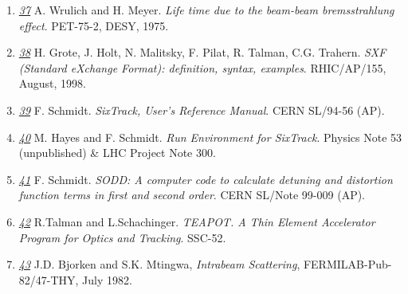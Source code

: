 \begin{enumerate}
	\item \href{wrulich}{\textit{37}} A. Wrulich and
          H. Meyer. \textit{Life time due to the beam-beam
            bremsstrahlung effect}. PET-75-2, DESY, 1975. 

	\item \href{SXF}{\textit{38}}  H. Grote, J. Holt, N. Malitsky,
          F. Pilat, R. Talman, C.G. Trahern. \textit{SXF (Standard
            eXchange Format): definition, syntax,
            examples}. RHIC/AP/155, August, 1998.  
	\label{bib:sxf}

	\item \href{SixTrack}{\textit{39}} F. Schmidt. \textit{SixTrack,
          User's Reference Manual}. CERN SL/94-56 (AP). 
	\label{bib:sixtrack}

	\item \href{SixTrack_Run_Environment}{\textit{40}} M. Hayes and
          F. Schmidt. \textit{Run Environment for SixTrack}. Physics
          Note 53 (unpublished) \& LHC Project Note 300. 
	\label{bib:sixtrack_run_environment}

	\item \href{SODD}{\textit{41}} F. Schmidt. \textit{SODD: A
          computer code to calculate detuning and distortion function
          terms in first and second order}. CERN SL/Note 99-009 (AP). 
	\label{bib:sodd}

	\item \href{TEAPOT}{\textit{42}} R.Talman and
          L.Schachinger. \textit{TEAPOT. A Thin Element Accelerator
            Program for Optics and Tracking}. SSC-52. 
	\label{bib:teapot}

	\item \href{bm1}{\textit{43}} J.D. Bjorken and S.K. Mtingwa,
          \textit{Intrabeam Scattering},  FERMILAB-Pub-82/47-THY, July
          1982.  
	\label{bib:bm1}

\end{enumerate}



